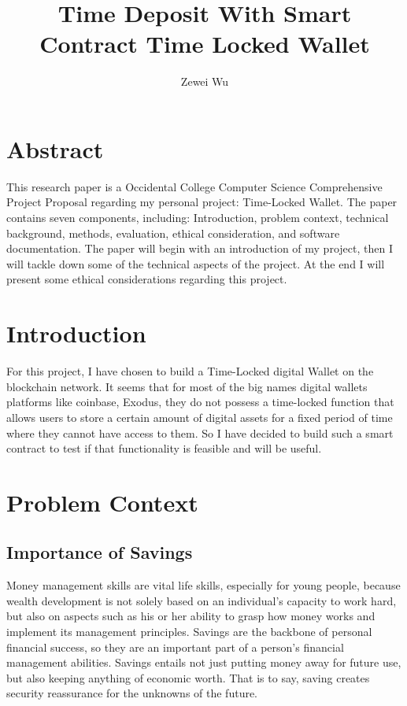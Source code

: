 \documentclass[10pt,twocolumn]{article}
\title{Time Deposit With Smart Contract Time Locked Wallet}
\author{Zewei Wu}
\affiliation{Occidental College}
\begin{document}
\maketitle

\section{Abstract}
This research paper is a Occidental College Computer Science Comprehensive Project Proposal regarding my personal project: Time-Locked Wallet. The paper contains seven components, including: Introduction, problem context, technical background, methods, evaluation, ethical consideration, and software documentation. The paper will begin with an introduction of my project, then I will tackle down some of the technical aspects of the project. At the end I will present some ethical considerations regarding this project.

\section{Introduction}

For this project, I have chosen to build a Time-Locked digital Wallet on the blockchain network. It seems that for most of the big names digital wallets platforms like coinbase, Exodus, they do not possess a time-locked function that allows users to store a certain amount of digital assets for a fixed period of time where they cannot have access to them. So I have decided to build such a smart contract to test if that functionality is feasible and will be useful.



\section{Problem Context}
	
\subsection{Importance of Savings}
Money management skills are vital life skills, especially for young people, because wealth development is not solely based on an individual's capacity to work hard, but also on aspects such as his or her ability to grasp how money works and implement its management principles. Savings are the backbone of personal financial success, so they are an important part of a person's financial management abilities. Savings entails not just putting money away for future use, but also keeping anything of economic worth. That is to say, saving creates security reassurance for the unknowns of the future.\cite{Loibl}
\end{document}

